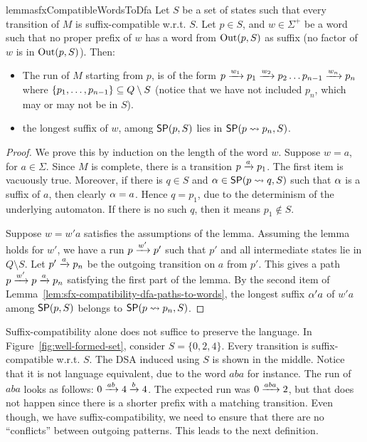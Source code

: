 \begin{restatable}{lemma}{sfxCompatibleWordsToDfa}
  \label{lem:sfx-compatibility-words-to-paths}
  Let $S$ be a set of states such that every transition of $M$ is
  suffix-compatible w.r.t. $S$. Let $p \in S$, and $w \in \Sigma^+$ be
  a word such that no proper prefix of $w$ has a word from
  $\operatorname{Out}(p,S)$ as suffix (no factor of $w$ is in $\operatorname{Out}(p,S)$). Then:
  \begin{itemize}
  \item The run of $M$ starting from $p$, is of the form
    $p \xrightarrow{w_1} p_1 \xrightarrow{w_2} p_2 \dots p_{n-1} \xrightarrow{w_n} p_n$ where
    $\{p_1, \dots, p_{n-1}\} \subseteq Q \setminus S$ (notice that we have
    not included $p_n$, which may or may not be in $S$).
  \item the longest suffix of $w$, among $\mathsf{SP}(p, S)$ lies in
    $\mathsf{SP}(p \rightsquigarrow p_n, S)$.
  \end{itemize}

\end{restatable}

\begin{proof}
  We prove this by induction on the length of the word $w$. Suppose
  $w = a$, for $a \in \Sigma$. Since $M$ is complete, there is a
  transition $p \xrightarrow{a} p_1$. The first item is vacuously
  true. Moreover, if there is $q \in S$ and $\alpha \in \mathsf{SP}(p \rightsquigarrow q, S)$
  such that $\alpha$ is a suffix of $a$, then clearly $\alpha = a$. Hence
  $q = p_1$, due to the determinism of the underlying automaton. If
  there is no such $q$, then it means $p_1\notin S$.

  Suppose $w = w'a$ satisfies the assumptions of the lemma. Assuming
  the lemma holds for $w'$, we have a run $p \xrightarrow{w'} p'$ such that
  $p'$ and all intermediate states lie in $Q \setminus S$. Let
  $p' \xrightarrow{a} p_n$ be the outgoing transition on $a$ from $p'$. This
  gives a path $p \xrightarrow{w'} p \xrightarrow{a} p_n$ satisfying the first part of
  the lemma. By the second item of
  Lemma~\ref{lem:sfx-compatibility-dfa-paths-to-words}, the longest
  suffix $\alpha'a$ of $w'a$ among $\mathsf{SP}(p, S)$ belongs to
  $\mathsf{SP}(p \rightsquigarrow p_n, S)$. %
\end{proof}


Suffix-compatibility alone does not suffice to preserve the
language. In Figure~\ref{fig:well-formed-set}, consider
$S = \{0, 2, 4\}$. Every transition is suffix-compatible
w.r.t. $S$. The DSA induced using $S$ is shown in the middle. Notice
that it is not language equivalent, due to the word $aba$ for
instance. The run of $aba$ looks as follows: $0 \xrightarrow{ab} 4 \xrightarrow{b}
4$. The expected run was $0 \xrightarrow{aba} 2$, but that does not happen
since there is a shorter prefix with a matching transition. Even
though, we have suffix-compatibility, we need to ensure that there are
no ``conflicts'' between outgoing patterns. This leads to the next
definition.



